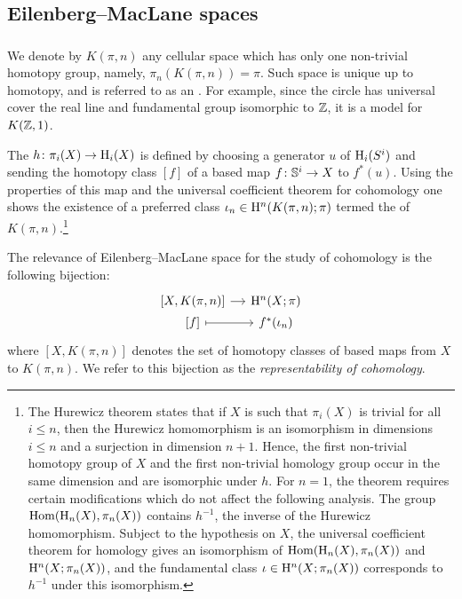 \subsection{Eilenberg--MacLane spaces}

\subsubsection{}

We denote by $K(\pi, n)$ any cellular space which has only one non-trivial homotopy group, namely, $\pi_n(K(\pi, n)) = \pi$.
Such space is unique up to homotopy, and is referred to as an .
For example, since the circle has universal cover the real line and fundamental group isomorphic to $\mathbb{Z}$, it is a model for $K(\mathbb{Z},1)$.

The  $h \colon \pi_i(X) \to \mathrm{H}_i(X)$ is defined by choosing a generator $u$ of $\mathrm{H}_i(S^i)$ and sending the homotopy class $[f]$ of a based map $f \colon \mathbb{S}^i \to X$ to $f^*(u)$.
Using the properties of this map and the universal coefficient theorem for cohomology one shows the existence of a preferred class $\iota_n \in \mathrm{H}^n(K(\pi, n); \pi)$ termed the  of $K(\pi, n)$.\footnote{The Hurewicz theorem states that if $X$ is such that $\pi_i(X)$ is trivial for all $i \leq n$, then the Hurewicz homomorphism is an isomorphism in dimensions $i \leq n$ and a surjection in dimension $n+1$.
	Hence, the first non-trivial homotopy group of $X$ and the first non-trivial homology group occur in the same dimension and are isomorphic under $h$.
	For $n=1$, the theorem requires certain modifications which do not affect the following analysis.
	The group $\mathrm{Hom}(\mathrm{H}_n(X), \pi_n(X))$ contains $h^{-1}$, the inverse of the Hurewicz homomorphism.
	Subject to the hypothesis on $X$, the universal coefficient theorem for homology gives an isomorphism of $\mathrm{Hom}(\mathrm{H}_n(X), \pi_n(X))$ and $\mathrm{H}^n(X; \pi_n(X))$, and the fundamental class $\iota \in \mathrm{H}^n(X; \pi_n(X))$ corresponds to $h^{-1}$ under this isomorphism.}

The relevance of Eilenberg--MacLane space for the study of cohomology is the following bijection:
\[
\begin{tikzcd}[column sep=small, row sep=0]
	{[X, K(\pi, n)]} \rar & \rH^n(X; \pi) \\
	{[f]} \rar[maps to] & f^*(\iota_n)
\end{tikzcd}
\]
where $[X, K(\pi, n)]$ denotes the set of homotopy classes of based maps from $X$ to $K(\pi, n)$.
We refer to this bijection as the \textit{representability of cohomology}.

